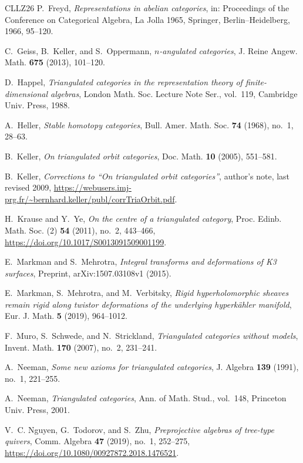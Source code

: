 \documentclass[a4paper,11pt,reqno]{amsart}
\theoremstyle{definition}
\theoremstyle{plain}
\numberwithin{equation}{section}
\begin{document}
\begin{thebibliography}{CLLZ26}
P.~Freyd,
\emph{Representations in abelian categories},
in: Proceedings of the Conference on Categorical Algebra, La Jolla 1965,
Springer, Berlin--Heidelberg, 1966, 95--120.

C.~Geiss, B.~Keller, and S.~Oppermann,
\emph{$n$-angulated categories},
J. Reine Angew. Math. \textbf{675} (2013), 101--120.

D.~Happel,
\emph{Triangulated categories in the representation theory of
finite-dimensional algebras},
London Math. Soc. Lecture Note Ser., vol.~119, Cambridge Univ. Press, 1988.

A.~Heller,
\emph{Stable homotopy categories},
Bull. Amer. Math. Soc. \textbf{74} (1968), no.~1, 28--63.

B.~Keller,
\emph{On triangulated orbit categories},
Doc. Math. \textbf{10} (2005), 551--581.

B.~Keller,
\emph{Corrections to ``On triangulated orbit categories''},
author's note, last revised 2009,
\url{https://webusers.imj-prg.fr/~bernhard.keller/publ/corrTriaOrbit.pdf}.

H.~Krause and Y.~Ye,
\emph{On the centre of a triangulated category},
Proc. Edinb. Math. Soc. (2) \textbf{54} (2011), no.~2, 443--466,
\url{https://doi.org/10.1017/S0013091509001199}.

E.~Markman and S.~Mehrotra,
\emph{Integral transforms and deformations of K3 surfaces},
Preprint, arXiv:1507.03108v1 (2015).

E.~Markman, S.~Mehrotra, and M.~Verbitsky,
\emph{Rigid hyperholomorphic sheaves remain rigid along twistor deformations
of the underlying hyperk\"ahler manifold},
Eur. J. Math. \textbf{5} (2019), 964--1012.

F.~Muro, S.~Schwede, and N.~Strickland,
\emph{Triangulated categories without models},
Invent. Math. \textbf{170} (2007), no.~2, 231--241.

A.~Neeman,
\emph{Some new axioms for triangulated categories},
J. Algebra \textbf{139} (1991), no.~1, 221--255.

A.~Neeman,
\emph{Triangulated categories},
Ann. of Math. Stud., vol.~148, Princeton Univ. Press, 2001.

V.~C. Nguyen, G.~Todorov, and S.~Zhu,
\emph{Preprojective algebras of tree-type quivers},
Comm. Algebra \textbf{47} (2019), no.~1, 252--275,
\url{https://doi.org/10.1080/00927872.2018.1476521}.


\end{thebibliography}
\end{document}
